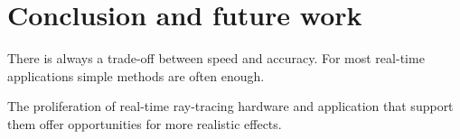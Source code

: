 \chapter{Conclusion and future work}
There is always a trade-off between speed and accuracy.
For most real-time applications simple methods are often enough.

The proliferation of real-time ray-tracing hardware and application that support them offer opportunities for more realistic effects.